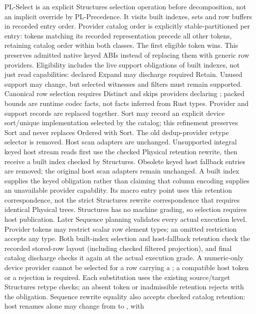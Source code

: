 PL-Select is an explicit Structures selection operation before decomposition,
not an implicit override by PL-Precedence. It visits built indexes, sets
and row buffers in recorded entry order. Provider catalog order is explicitly
stable-partitioned per entry: tokens matching its recorded representation
precede all other tokens, retaining catalog order within both classes.
The first eligible token wins. This preserves admitted native keyed ABIs
instead of replacing them with generic row providers.
Eligibility includes the live support obligations of built indexes, not just
read capabilities: declared Expand may discharge required Retain. Unused
support may change, but selected witnesses and filters must remain supported.
Canonical row selection requires Distinct and skips providers declaring
; packed bounds are runtime codec facts, not facts inferred
from Rust types. Provider and support records are replaced together.
Sort may record an
explicit  device sort/unique implementation selected by the
catalog; this refinement preserves Sort and never replaces Ordered with Sort.
The old dedup-provider retype selector is removed. Host scan adapters are unchanged.
Unsupported integral keyed host stream reads first use the checked Physical
 retention rewrite, then receive a built index
checked by Structures. Obsolete keyed host fallback entries are removed;
the original host scan adapters remain unchanged. A built index supplies
the keyed obligation rather than claiming that column encoding supplies
an unavailable provider capability.
Its macro entry point uses this retention correspondence, not the strict
Structures rewrite correspondence that requires identical Physical trees.
Structures has no machine grading, so selection requires host publication.
Later Sequence planning validates every actual execution level.
Provider tokens may restrict scalar row element types; an omitted restriction
accepts any type. Both built-index selection and host-fallback retention
check the recorded stored-row layout (including checked filtered projection),
and final catalog discharge checks it again at the actual execution grade.
A numeric-only device provider cannot be selected
for a row carrying a ; a compatible host token or a rejection
is required.
Each substitution uses the existing source/target Structures retype checks;
an absent token or inadmissible retention rejects with the obligation.
Sequence rewrite equality also accepts checked catalog retention:
host renames alone may change from  to , with
